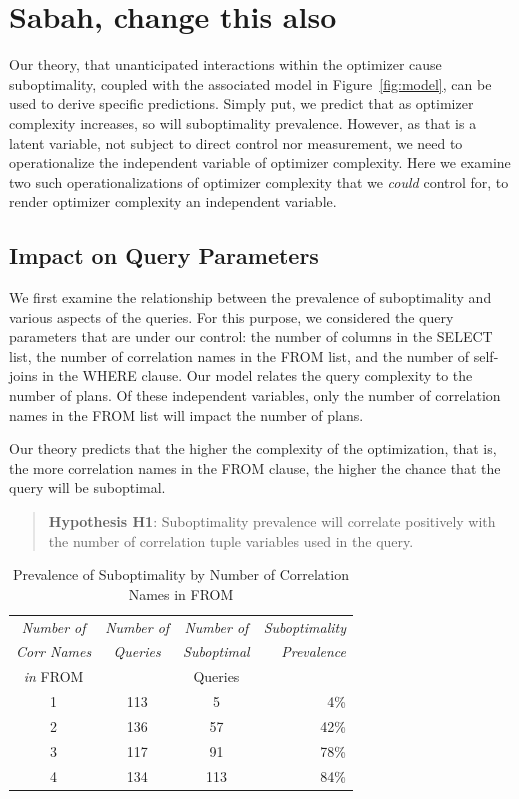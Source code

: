 \section{Sabah, change this also}
Our theory, that unanticipated interactions within the optimizer cause
suboptimality, coupled with the associated model in Figure~\ref{fig:model}, can be used
to derive specific predictions.  Simply put, we predict that as optimizer
complexity increases, so will suboptimality prevalence. However, as that is
a latent variable, not subject to direct control nor measurement,
we need to operationalize the independent variable of
optimizer complexity. Here we examine two such operationalizations of optimizer
complexity that we {\em could} control for, to render optimizer complexity
an independent variable.

\subsection{Impact on Query Parameters}
We first examine the relationship between
the prevalence of suboptimality and various aspects of the queries. For this
purpose, we considered the query parameters that are under our control: the
number of columns in the SELECT list, the number of correlation names in the
FROM list, and the number of self-joins in the WHERE clause. Our model
relates the query complexity to the number of plans. Of these independent
variables, only the number of correlation names in the FROM list will impact
the number of plans.

Our theory predicts that the higher the complexity of the optimization, that
is, the more correlation names in the FROM clause,
the higher the chance that the query will be suboptimal.

\begin{quote}
{\bf Hypothesis H1}: Suboptimality prevalence will correlate positively
with the number of correlation \hbox{tuple} variables used in the query.
\end{quote}

\begin{table}[t]
\begin{center}
\begin{tabular}{c|c|c|r}
{\em Number of} & {\em Number of} & {\em Number of} & \multicolumn{1}{|c}{\em Suboptimality}\\
{\em Corr Names}&{\em Queries}&{\em Suboptimal}&{\em Prevalence}\\
{\em in} FROM&&Queries&\\
\hline
1 & 113 & 5 & 4\%\\
2 & 136 & 57 & 42\%\\
3 & 117 & 91 & 78\%\\
4 & 134 & 113 & 84\%
\end{tabular}
\end{center}
\caption{Prevalence of Suboptimality by Number of Correlation Names in
FROM\label{tab:numcnfrm}}
\end{table}


